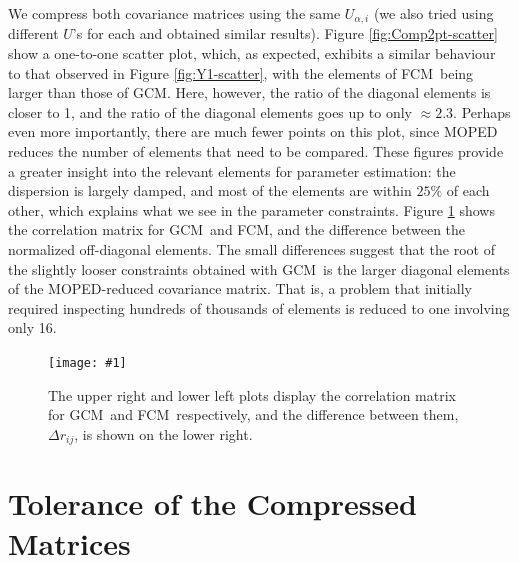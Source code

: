 \documentclass[twocolumn,nofootinbib]{\docclass}
\newcommand{\sfig}[2]{
	\texttt{[image: \#1]}
}
\newcommand{\Sfig}[2]{
	\begin{figure}[thbp]
		\sfig{../figures/#1.pdf}{\columnwidth}
		\caption{{\small #2}}
		\label{fig:#1}
	\end{figure}
}
\newcommand{\rf}[1]{Figure \ref{fig:#1}}
\newcommand\full{FCM}
\newcommand\gaussian{GCM}
\begin{document}
	We compress both covariance matrices using the same $U_{\alpha, i}$ (we also tried using different $U$'s for each and obtained similar results).
	\rf{Comp2pt-scatter} show a one-to-one scatter plot, which, as expected, exhibits a similar behaviour to that observed in \rf{Y1-scatter}, with the elements of \full\ being larger than those of \gaussian. Here, however, the ratio of the diagonal elements is closer to 1, and the ratio of the diagonal elements goes up to only $\approx 2.3$. Perhaps even more importantly, there are much fewer points on this plot, since MOPED reduces the number of elements that need to be compared. These figures provide a greater insight into the relevant elements for parameter estimation: the dispersion is largely damped, and most of the elements are within $25\%$ of each other, which explains what we see in the parameter constraints. \rf{Comp2pt-correlation} shows the correlation matrix for \gaussian\ and \full, and the difference between the normalized off-diagonal elements. The small differences suggest that the root of the slightly looser constraints obtained with \gaussian\ is the larger diagonal elements of the MOPED-reduced covariance matrix. That is, a problem that initially required inspecting hundreds of thousands of elements is reduced to one involving only 16.
	
	\Sfig{Comp2pt-correlation}{The upper right and lower left plots display the correlation matrix for \gaussian\ and \full\ respectively, and the difference between them, $\Delta r_{ij}$, is shown on the lower right.}
	
	\section{Tolerance of the Compressed Matrices}
	\label{sec:tolerance}
	
\end{document}
